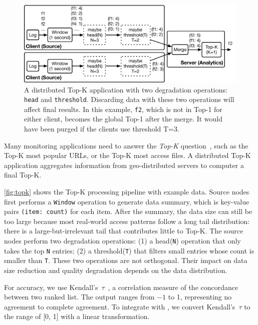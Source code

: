 \documentclass[twocolumn, 9pt]{article}
\begin{document}
\begin{figure}
  \centering
  \includegraphics[width=\columnwidth]{figures/topk.pdf}
  \caption{A distributed Top-K application with two degradation operations:
    \texttt{head} and \texttt{threshold}. Discarding data with these two
    operations will affect final results. In this example, \texttt{f2}, which is
    not in Top-1 for either client, becomes the global Top-1 after the merge. It
    would have been purged if the clients use threshold T=3.}
  \label{fig:topk}
\end{figure}

 Many monitoring applications need to answer the
\textit{Top-K} question~\cite{babcock2003distributed}, such as the Top-K most
popular URLs, or the Top-K most access files. A distributed Top-K application
aggregates information from geo-distributed servers to computer a final Top-K.

\autoref{fig:topk} shows the Top-K processing pipeline with example data. Source
nodes first performs a \texttt{Window} operation to generate data summary, which
is key-value pairs \texttt{(item: count)} for each item. After the summary, the
data size can still be too large because most real-world access patterns follow
a long tail distribution: there is a large-but-irrelevant tail that contributes
little to Top-K. The source nodes perform two degradation operations: (1) a
head(\texttt{N}) operation that only takes the top \texttt{N} entries; (2) a
threshold(\texttt{T}) that filters small entries whose count is smaller than
\texttt{T}. These two operations are not orthogonal. Their impact on data size
reduction and quality degradation depends on the data distribution.

For accuracy, we use Kendall's~$\tau$~\cite{abdi2007kendall}, a correlation
measure of the concordance between two ranked list. The output ranges from
\(-1\) to 1, representing no agreement to complete agreement. To integrate with
\sysname{}, we convert Kendall's~$\tau$ to the range of [0, 1] with a linear
transformation.
\end{document}
